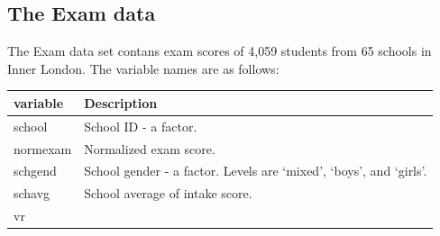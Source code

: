 \documentclass[]{book}
\begin{document}
\subsection{The Exam data}\label{the-exam-data}

The Exam data set contans exam scores of 4,059 students from 65 schools
in Inner London. The variable names are as follows:

\begin{longtable}[]{@{}ll@{}}
\toprule
\begin{minipage}[b]{0.09\columnwidth}\raggedright\strut
variable\strut
\end{minipage} & \begin{minipage}[b]{0.85\columnwidth}\raggedright\strut
Description\strut
\end{minipage}\tabularnewline
\midrule
\endhead
\begin{minipage}[t]{0.09\columnwidth}\raggedright\strut
school\strut
\end{minipage} & \begin{minipage}[t]{0.85\columnwidth}\raggedright\strut
School ID - a factor.\strut
\end{minipage}\tabularnewline
\begin{minipage}[t]{0.09\columnwidth}\raggedright\strut
normexam\strut
\end{minipage} & \begin{minipage}[t]{0.85\columnwidth}\raggedright\strut
Normalized exam score.\strut
\end{minipage}\tabularnewline
\begin{minipage}[t]{0.09\columnwidth}\raggedright\strut
schgend\strut
\end{minipage} & \begin{minipage}[t]{0.85\columnwidth}\raggedright\strut
School gender - a factor. Levels are `mixed', `boys', and `girls'.\strut
\end{minipage}\tabularnewline
\begin{minipage}[t]{0.09\columnwidth}\raggedright\strut
schavg\strut
\end{minipage} & \begin{minipage}[t]{0.85\columnwidth}\raggedright\strut
School average of intake score.\strut
\end{minipage}\tabularnewline
\begin{minipage}[t]{0.09\columnwidth}\raggedright\strut
vr\strut
\end{minipage} & \begin{minipage}[t]{0.85\columnwidth}\raggedright\strut

\end{minipage}
\end{longtable}
\end{document}
